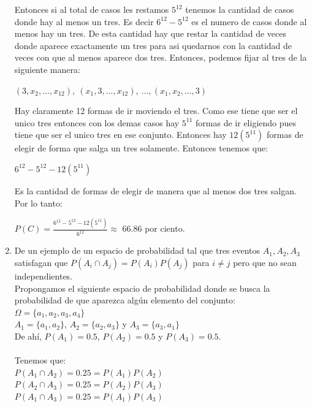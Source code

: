 \documentclass[12pt,a4paper]{report}
\begin{document}
\begin{enumerate}
{\begin{enumerate}[label=\alph*) ]
{\begin{center}
    \end{center}
    Entonces si al total de casos les restamos $5^{12}$ tenemos la cantidad de casos donde hay al menos un tres. Es decir $6^{12}-5^{12}$ es el numero de casos donde al menos hay un tres. De esta cantidad hay que restar la cantidad de veces donde aparece exactamente un tres para asi quedarnos con la cantidad de veces con que al menos aparece dos tres. Entonces, podemos fijar al tres de la siguiente manera:\\
    \begin{center}
    $(3,x_{2},...,x_{12}), \ (x_{1},3,...,x_{12}), \ ... ,(x_{1},x_{2},...,3)$
    \end{center}
    Hay claramente 12 formas de ir moviendo el tres. Como ese tiene que ser el unico tres entonces con los demas casos hay $5^{11}$ formas de ir eligiendo pues tiene que ser el unico tres en ese conjunto. Entonces hay $12(5^{11})$ formas de elegir de forma que salga un tres solamente. Entonces tenemos que:\\
    \begin{center}
    $6^{12}-5^{12}-12(5^{11})$
    \end{center}
    Es la cantidad de formas de elegir de manera que al menos dos tres salgan. Por lo tanto:\\
    \begin{center}
    $P(C)=\frac{6^{12}-5^{12}-12(5^{11})}{6^{12}} \approx$ 66.86 por ciento.
    \end{center}

    }
    \end{enumerate}
	}


   \item {
   De un ejemplo de un espacio de probabilidad tal que tres eventos $A_{1},A_{2},A_{3}$ satisfagan que $P(A_{i}\cap A_{j})=P(A_{i})P(A_{j})$ para $i\neq j$ pero que no sean independientes.\\
     Propongamos el siguiente espacio de probabilidad donde se busca la probabilidad de que aparezca algún elemento del conjunto:\\
  $\Omega = \lbrace a_{1}, a_{2}, a_{3}, a_{4} \rbrace$\\
  $A_{1} = \lbrace a_{1}, a_{2} \rbrace$, $A_{2} = \lbrace a_{2}, a_{3} \rbrace$ y $A_{3} =  \lbrace a_{3}, a_{1} \rbrace$\\
  De ahí, $P(A_{1}) = 0.5$, $P(A_{2}) = 0.5$ y $P(A_{3}) = 0.5$.\\\\
  Tenemos que:\\
  $P(A_{1} \cap A_{2}) = 0.25 = P(A_{1})P(A_{2})$\\
  $P(A_{2} \cap A_{3}) = 0.25 = P(A_{2})P(A_{3})$\\
  $P(A_{1} \cap A_{3}) = 0.25 = P(A_{1})P(A_{3})$\\

}
\end{enumerate}
\end{document}
